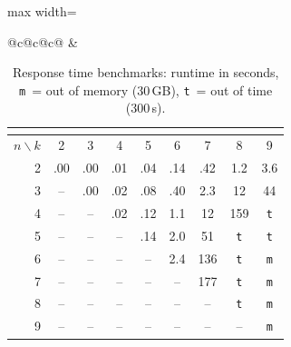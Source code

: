 \documentclass[10pt]{article}
\newcommand{\ValFunction}[1]{{\textsf{#1}}\xspace}
\newcommand{\Sup}{\ValFunction{Sup}}
\newcommand{\SumBound}{\ValFunction{Sum$^B$}}
\newcommand{\oom}{\texttt{m}}
\newcommand{\oot}{\texttt{t}}
\begin{document}
\begin{table}[t]
\begin{adjustbox}{max width=\linewidth}
\begin{tabular}{@{}c@{\qquad}c@{\qquad}c@{}}
			&
			\begin{tabular}[t]{@{}r*{8}{c}@{}}
				\multicolumn{9}{c}{\makebox[0pt]{(c) (\Sup,\SumBound) universality}}\\[2pt]
				\toprule
				$n\backslash k$ & 2 & 3 & 4 & 5 & 6 & 7 & 8 & 9 \\
				\midrule
				2 & .00 & .00 & .01 & .04 & .14 & .42 & 1.2 & 3.6 \\
				3 & -- & .00 & .02 & .08 & .40 & 2.3 & 12 & 44 \\
				4 & -- & -- & .02 & .12 & 1.1 & 12 & 159 & \oot \\
				5 & -- & -- & -- & .14 & 2.0 & 51 & \oot & \oot \\
				6 & -- & -- & -- & -- & 2.4 & 136 & \oot & \oom \\
				7 & -- & -- & -- & -- & -- & 177 & \oot & \oom \\
				8 & -- & -- & -- & -- & -- & -- & \oot & \oom \\
				9 & -- & -- & -- & -- & -- & -- & -- & \oom \\
				\bottomrule
			\end{tabular}
		\end{tabular}
	\end{adjustbox}
	\vspace{0.25em}
	\caption{Response time benchmarks: runtime in seconds, \oom~= out of memory (30\,GB), \oot~= out of time (300\,s). \vspace{-2.5em}}
	\label{fig:response_time_benchmarks}
\end{table}
\end{document}
